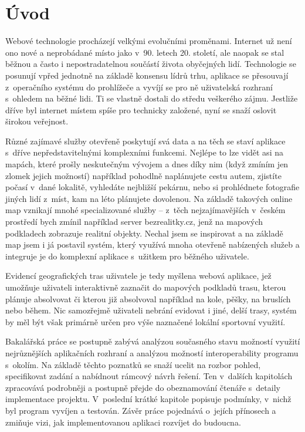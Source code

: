 \chapter*{Úvod}

Webové technologie procházejí velkými evolučními proměnami. Internet
už není ono nové a neprobádané místo jako v~90. letech 20.
století, ale naopak se stal běžnou a často i nepostradatelnou
součástí života obyčejných lidí. Technologie se posunují vpřed
jednotně na základě konsensu lídrů trhu, aplikace se přesouvají
z~operačního systému do prohlížeče a vyvíjí se pro ně uživatelská
rozhraní s~ohledem na běžné lidi. Ti se vlastně dostali do středu
veškerého zájmu. Jestliže dříve byl internet místem spíše pro
technicky založené, nyní se snaží oslovit širokou veřejnost.

Různé zajímavé služby otevřeně poskytují svá data a na těch se staví
aplikace s~dříve nepředstavitelnými komplexními funkcemi. Nejlépe to lze vidět
asi na mapách, které prošly neskutečným vývojem a dnes díky nim (když
zmíním jen zlomek jejich možností) například pohodlně naplánujete
cestu autem, zjistíte počasí v~dané lokalitě, vyhledáte nej\-bližší
pekárnu, nebo si prohlédnete fotografie jiných lidí z~míst, kam na
léto plánujete dovolenou. Na základě takových online map vznikají
mnohé specializované služby -- z~těch nej\-zajímavějších v~českém
prostředí bych zmínil například server bezrealitky.cz, jenž na
mapových podkladech zobrazuje realitní objekty. Nechal jsem se
inspirovat a na základě map jsem i já postavil systém, který využívá
mnoha otevřeně nabízených služeb a integruje je do komplexní aplikace
s~užitkem pro běžného uživatele.

Evidencí geografických tras uživatele je tedy myšlena webová aplikace,
jež umožňuje uživateli interaktivně zaznačit do mapových podkladů trasu,
kterou plánuje absolvovat či kterou již absolvoval například na kole,
pěšky, na bruslích nebo během. Nic samozřejmě uživateli nebrání
evidovat i jiné, delší trasy, systém by měl být však primárně určen
pro výše naznačené lokální sportovní využití.

Bakalářská práce se postupně zabývá analýzou současného stavu
možností využití nej\-různějších aplikačních rozhraní a analýzou
možností interoperability programu s~okolím. Na základě těchto
poznatků se snaží ucelit na rozbor pohled, specifikovat zadání a
nabídnout rámcový návrh řešení. Ten v~dalších kapitolách zpracovává
podrobněji a postupně přejde do obeznamování čtenáře s~detaily
implementace projektu. V~poslední krátké kapitole popisuje podmínky,
v~nichž byl program vyvíjen a testován. Závěr práce pojednává
o~jejích přínosech a zmiňuje vizi, jak implementovanou aplikaci
rozvíjet do budoucna.

